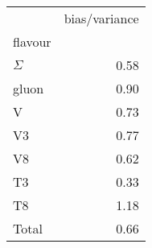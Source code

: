 \begin{center}
    \begin{tabular}{lr}
        \toprule
        {} &  bias/variance \\
        flavour  &                \\
        \midrule
        $\Sigma$ &           0.58 \\
        gluon    &           0.90 \\
        V        &           0.73 \\
        V3       &           0.77 \\
        V8       &           0.62 \\
        T3       &           0.33 \\
        T8       &           1.18 \\
        Total    &           0.66 \\
        \bottomrule
        \end{tabular}
\end{center}